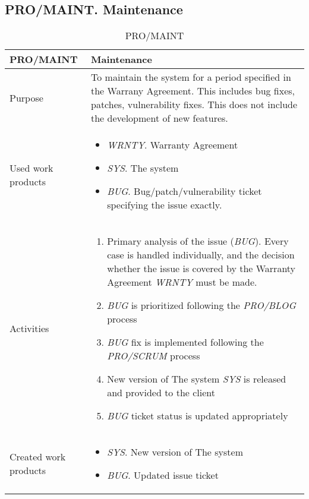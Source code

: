 \subsection{PRO/MAINT. Maintenance}
\begin{table}[]
\begin{tabular}{l|p{}}
\hline
\textbf{PRO/MAINT}    & \textbf{Maintenance} \\ \hline
Purpose &  To maintain the system for a period specified in the Warrany Agreement. This includes bug fixes, patches, vulnerability fixes. This does not include the development of new features. \\ \hline
Used work products    &      
\begin{itemize}
    \item \textit{WRNTY}. Warranty Agreement
    \item \textit{SYS}. The system
    \item \textit{BUG}. Bug/patch/vulnerability ticket specifying the issue exactly.
\end{itemize}
\\ \hline
Activities            &   
\begin{enumerate}
    \item Primary analysis of the issue (\textit{BUG}). Every case is handled individually, and the decision whether the issue is covered by the Warranty Agreement \textit{WRNTY} must be made.
    \item \textit{BUG} is prioritized following the \textit{PRO/BLOG} process
    \item \textit{BUG} fix is implemented following the \textit{PRO/SCRUM} process
    \item New version of The system \textit{SYS} is released and provided to the client
    \item \textit{BUG} ticket status is updated appropriately
\end{enumerate}
\\ \hline
Created work products &     
\begin{itemize}
    \item \textit{SYS}. New version of The system
    \item \textit{BUG}. Updated issue ticket
\end{itemize}
\end{tabular}
\caption{PRO/MAINT}
\label{pro/MAINT}
\end{table}


